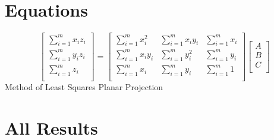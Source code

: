 \documentclass[journal,onecolumn]{IEEEtran}
\begin{document}
\appendices
\section{Equations}

\begin{equation}\label{eqn:MLS}
	\left[ {\begin{array}{cc}
			\sum_{i=1}^{m} x_i z_i \\
			\sum_{i=1}^{m} y_i z_i \\
			\sum_{i=1}^{m} z_i \\
			
	\end{array} } \right]
	=
	\left[ {\begin{array}{ccc}
			\sum_{i=1}^{m} x_i^2 		& \sum_{i=1}^{m} x_i y_i 		& \sum_{i=1}^{m} x_i \\
			\sum_{i=1}^{m} x_i y_i 		& \sum_{i=1}^{m} y_i^2 			& \sum_{i=1}^{m} y_i \\
			\sum_{i=1}^{m} x_i 			& \sum_{i=1}^{m} y_i 			& \sum_{i=1}^{m} 1   \\
	\end{array} } \right]
	\left[ {\begin{array}{cc}
			A\\
			B\\
			C\\
	\end{array} } \right]
\end{equation}
\centering
{Method of Least Squares Planar Projection}



\section{All Results}\label{apdx:Appendix_2}
\end{document}

